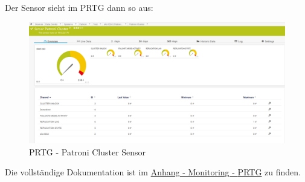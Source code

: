 \begin{flushleft}
    Der Sensor sieht im \Gls{PRTG} dann so aus:
    \begin{figure}[H]
        \centering
        \includegraphics[width=1\linewidth]{source/implementation/construction_implementation/monitoring/patroni_cluster_sensor}
        \caption{\Gls{PRTG} - Patroni Cluster Sensor}
        \label{fig:patroni_cluster_sensor}
    \end{figure}
\end{flushleft}
\begin{flushleft}
    Die vollständige Dokumentation ist im \hyperref[sec:monitoring]{Anhang - Monitoring - \Gls{PRTG}} zu finden.
\end{flushleft}